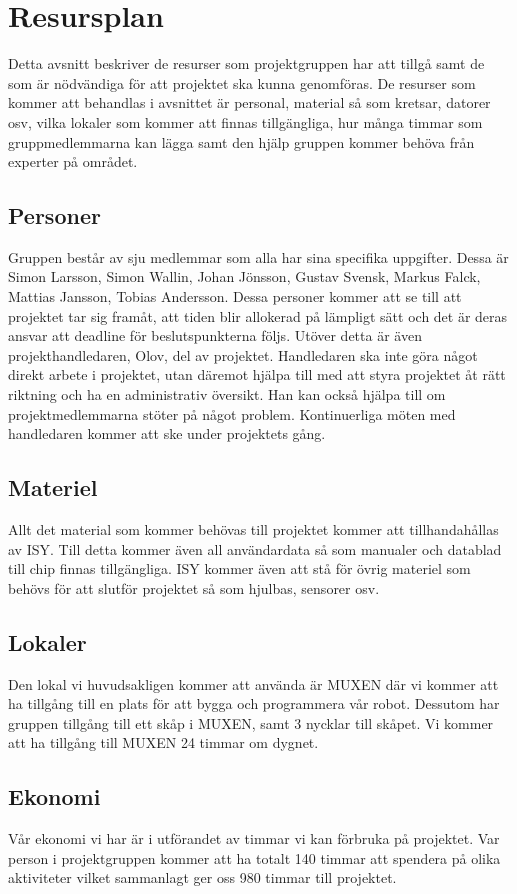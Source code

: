 \documentclass[a4paper,12pt]{article}
\begin{document}
\section{Resursplan}	%
Detta avsnitt beskriver de resurser som projektgruppen har att tillgå samt de som är nödvändiga för att projektet ska kunna genomföras. De resurser som kommer att behandlas i avsnittet är personal, material så som kretsar, datorer osv, vilka lokaler som kommer att finnas tillgängliga, hur många timmar som gruppmedlemmarna kan lägga samt den hjälp gruppen kommer behöva från experter på området. 
\subsection{Personer}
Gruppen består av sju medlemmar som alla har sina specifika uppgifter. Dessa är Simon Larsson, Simon Wallin, Johan Jönsson, Gustav Svensk, Markus Falck, Mattias Jansson, Tobias Andersson. Dessa personer kommer att se till att projektet tar sig framåt, att tiden blir allokerad på lämpligt sätt och det är deras ansvar att deadline för beslutspunkterna följs. Utöver detta är även projekthandledaren, Olov, del av projektet. Handledaren ska inte göra något direkt arbete i projektet, utan däremot hjälpa till med att styra projektet åt rätt riktning och ha en administrativ översikt. Han kan också hjälpa till om projektmedlemmarna stöter på något problem. Kontinuerliga möten med handledaren kommer att ske under projektets gång.
\subsection{Materiel}
Allt det material som kommer behövas till projektet kommer att tillhandahållas av ISY. Till detta kommer även all användardata så som manualer och datablad till chip finnas tillgängliga. ISY kommer även att stå för övrig materiel som behövs för att slutför projektet så som hjulbas, sensorer osv.
\subsection{Lokaler}
Den lokal vi huvudsakligen kommer att använda är MUXEN där vi kommer att ha tillgång till en plats för att bygga och programmera vår robot. Dessutom har gruppen tillgång till ett skåp i MUXEN, samt 3 nycklar till skåpet. Vi kommer att ha tillgång till MUXEN 24 timmar om dygnet. 
\subsection{Ekonomi}
Vår ekonomi vi har är i utförandet av timmar vi kan förbruka på projektet. Var person i projektgruppen kommer att ha totalt 140 timmar att spendera på olika aktiviteter vilket sammanlagt ger oss 980 timmar till projektet.
\end{document}
